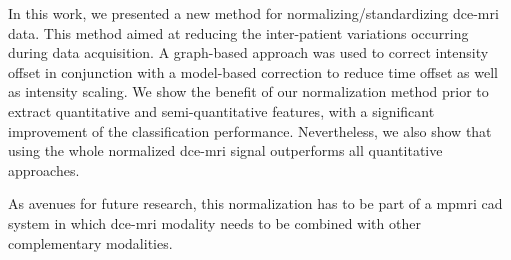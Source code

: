In this work, we presented a new method for normalizing/standardizing \ac{dce}-\ac{mri} data.
This method aimed at reducing the inter-patient variations occurring during data acquisition.
A graph-based approach was used to correct intensity offset in conjunction with a model-based correction to reduce time offset as well as intensity scaling.
We show the benefit of our normalization method prior to extract quantitative and semi-quantitative features, with a significant improvement of the classification performance.
Nevertheless, we also show that using the whole normalized \ac{dce}-\ac{mri} signal outperforms all quantitative approaches.

As avenues for future research, this normalization has to be part of a \ac{mpmri} \ac{cad} system in which \ac{dce}-\ac{mri} modality needs to be combined with other complementary modalities.
